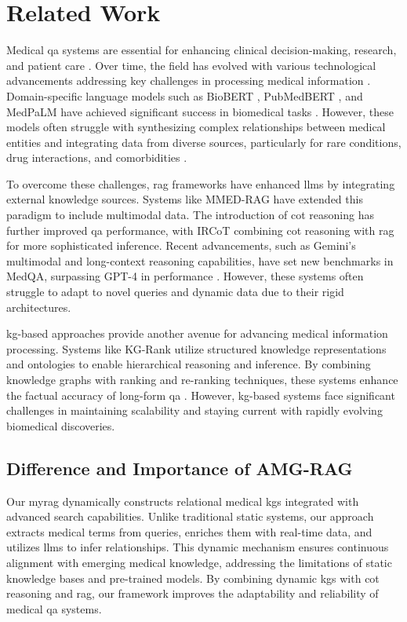 \section{Related Work}
Medical \gls{qa} systems are essential for enhancing clinical decision-making, research, and patient care \cite{nazi2024large,liu2023utility,rezaei2024rag}. Over time, the field has evolved with various technological advancements addressing key challenges in processing medical information \cite{singhal2022large}. Domain-specific language models such as BioBERT \cite{lee2020biobert}, PubMedBERT \cite{gu2021domain}, and MedPaLM \cite{singhal2023large} have achieved significant success in biomedical tasks \cite{rohanian2024exploring}. However, these models often struggle with synthesizing complex relationships between medical entities and integrating data from diverse sources, particularly for rare conditions, drug interactions, and comorbidities \cite{zhou2023survey,yu2024large}.

To overcome these challenges, \gls{rag} frameworks \cite{rezaei2025vendirag,lewis2020retrieval} have enhanced \glspl{llm} by integrating external knowledge sources. Systems like MMED-RAG \cite{xia2024mmed} have extended this paradigm to include multimodal data. The introduction of \gls{cot} reasoning has further improved \gls{qa} performance, with IRCoT \cite{trivedi2022interleaving} combining \gls{cot} reasoning with \gls{rag} for more sophisticated inference. Recent advancements, such as Gemini's multimodal and long-context reasoning capabilities, have set new benchmarks in MedQA, surpassing GPT-4 in performance \cite{saab2024capabilities}. However, these systems often struggle to adapt to novel queries and dynamic data due to their rigid architectures.

\gls{kg}-based approaches provide another avenue for advancing medical information processing. Systems like KG-Rank \cite{huang2021knowledge} utilize structured knowledge representations and ontologies to enable hierarchical reasoning and inference. By combining knowledge graphs with ranking and re-ranking techniques, these systems enhance the factual accuracy of long-form \gls{qa} \cite{yang2024kg}. However, \gls{kg}-based systems face significant challenges in maintaining scalability and staying current with rapidly evolving biomedical discoveries.

\subsection*{Difference and Importance of AMG-RAG}

Our \gls{myrag} dynamically constructs relational medical \glspl{kg} integrated with advanced search capabilities. Unlike traditional static systems, our approach extracts medical terms from queries, enriches them with real-time data, and utilizes \glspl{llm} to infer relationships. This dynamic mechanism ensures continuous alignment with emerging medical knowledge, addressing the limitations of static knowledge bases and pre-trained models. By combining dynamic \glspl{kg} with \gls{cot} reasoning and \gls{rag}, our framework improves the adaptability and reliability of medical \gls{qa} systems.